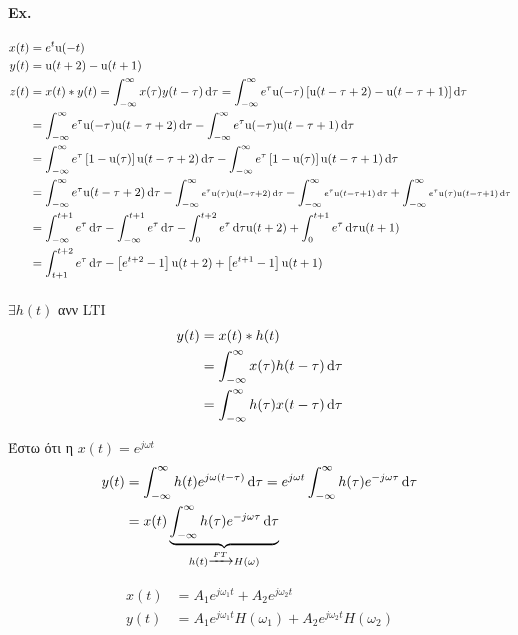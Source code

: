 	\paragraph{Ex.}
	\begin{align*}
	x(t) &= e^t\mathrm u(-t) \\
	y(t) &= \mathrm u(t+2)-\mathrm u(t+1) \\
	z(t) &= x(t) * y(t) = \int_{-\infty}^{\infty} x(\tau)y(t-\tau)\dif\tau
	= \int_{-\infty}^{\infty} e^\tau\mathrm u(-\tau)\left[
	\mathrm u(t-\tau+2)-\mathrm u(t-\tau+1)
	\right]\dif\tau
	\\ &= \int_{-\infty}^{\infty} e^\tau
	\mathrm u(-\tau)\mathrm u(t-\tau+2)\dif\tau - \int_{-\infty}^{\infty}
	e^\tau \mathrm u(-\tau)\mathrm u(t-\tau+1)\dif\tau
	\\ &= \int_{-\infty}^{\infty} e^\tau
	\left[ 1-\mathrm u(\tau) \right]\mathrm u(t-\tau+2)\dif\tau -
	\int_{-\infty}^{\infty} e^\tau \left[ 1-\mathrm u(\tau) \right]
	\mathrm u(t-\tau+1)\dif\tau
	\\ &= \int_{-\infty}^{\infty}
	\mathsmaller{e^\tau \mathrm u(t-\tau+2)\dif\tau}
	- \int_{-\infty}^{\infty}
	\mathsmaller{\mathsmaller{
		 e^\tau \mathrm u(\tau) \mathrm u(t-\tau+2)\dif\tau}}
	- \int_{-\infty}^{\infty}
	\mathsmaller{\mathsmaller{ e^\tau \mathrm u(t-\tau+1)\dif\tau}}
	+ \int_{-\infty}^{\infty}\mathsmaller{\mathsmaller{
		 e^\tau \mathrm u(\tau)\mathrm u(t-\tau+1)\dif\tau}}
	\\ &= \int_{-\infty}^{t+1} e^\tau\dif\tau - \int_{-\infty}^{t+1}e^\tau\dif\tau
	- \int_0^{t+2}e^\tau\dif\tau\mathrm u(t+2)
	+ \int_0^{t+1}e^\tau\dif\tau \mathrm u(t+1)
	\\ &= \int_{t+1}^{t+2}e^\tau\dif\tau
	-\left[ e^{t+2}-1 \right]\mathrm u(t+2)
	+\left[ e^{t+1}-1 \right]\mathrm u(t+1)
	\end{align*}


	\paragraph{}
	\( \exists h(t) \) ανν LTI
	\begin{align*}
		y(t) &= x(t)*h(t) \\ &=\int_{-\infty}^{\infty} x(\tau)h(t-\tau)\mathop{}\!\mathrm{d}\tau
		\\ &= \int_{-\infty}^{\infty} h(\tau)x(t-\tau)\mathop{}\!\mathrm{d}\tau
	\end{align*}

	Έστω ότι η \( x(t) = e^{j\omega t} \)
	\begin{align*}
	y(t) &= \int_{-\infty}^{\infty} h(t) e^{j\omega(t-\tau)}\dif\tau
	= e^{j\omega t} \int_{-\infty}^{\infty} h(\tau)e^{-j\omega\tau}\dif\tau
	\\ &= x(t)\underbrace{\int_{-\infty}^{\infty} h(\tau)e^{-j\omega\tau}\dif\tau}_{\mathclap{h(t) \xrightarrow{FT} H(\omega)}}
	\end{align*}

	\begin{align*}
	x(t) &= A_1e^{j\omega_1 t} + A_2e^{j\omega_2 t} \\
	y(t) &= A_1e^{j\omega_1 t}H(\omega_1)+A_2e^{j\omega_2t}H(\omega_2)
	\end{align*}
